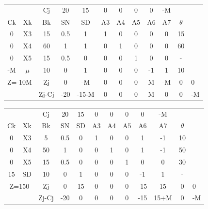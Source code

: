 \documentclass[a4paper,10pt]{article}
\begin{document}
\begin{center}
 \begin{tabular}{| c c c | c  c  c  c  c  c  c  c |}
    \hline
     	&			&   Cj   &   20    &   15    &   0    &   0    &   0    &   0    &   -M   &	       \\ 
    Ck 	&   Xk			&   Bk   &   SN    &   SD    &   A3   &   A4   &   A5   &   A6   &   A7   &  $\theta$    \\ \hline
    0   &   X3			&   15   &   0.5   &   1     &   1    &   0    &   0    &   0    &   0    &  15  		\\
    0 	&   X4			&   60   &   1     &   1     &   0    &   1    &   0    &   0    &   0    &  60	        \\ 
    0 	&   X5			&   15   &   0.5   &   0     &   0    &   0    &   1    &   0    &   0    &   - 		\\ 
   -M 	&   $\mu$		&   10   &   0     &   1     &   0    &   0    &   0    &  -1    &   1    &  10  		\\ \hline
\multicolumn{2}{|c|}{Z=-10M}	& Zj 	 &   0     &  -M     &   0    &   0    &   0    &   M    &  -M    &   0   &   0    	&    		\\ 
\multicolumn{2}{|c|}{}		& Zj-Cj  &  -20    &  -15-M  &   0    &   0    &   0    &   M    &   0    &   0    		&   -M   &    \\ 
    \hline
 \end{tabular}
\end{center}

\begin{center}
 \begin{tabular}{| c c c | c  c  c  c  c  c  c  c |}
    \hline
     	&			&   Cj   &   20    &   15    &   0    &   0    &   0    &   0    &   -M   &	       \\ 
    Ck 	&   Xk			&   Bk   &   SN    &   SD    &   A3   &   A4   &   A5   &   A6   &   A7   &  $\theta$    \\ \hline
    0   &   X3			&    5   &   0.5   &   0     &   1    &   0    &   0    &   1    &  -1    &  10  		\\
    0 	&   X4			&   50   &   1     &   0     &   0    &   1    &   0    &   1    &  -1    &  50	        \\ 
    0 	&   X5			&   15   &   0.5   &   0     &   0    &   0    &   1    &   0    &   0    &  30 		\\ 
    15 	&   SD			&   10   &   0     &   1     &   0    &   0    &   0    &  -1    &   1    &   -  		\\ \hline
\multicolumn{2}{|c|}{Z=150}	& Zj 	 &   0     &   15    &   0    &   0    &   0    &  -15   &   15   &   0   &   0    	&    		\\ 
 \multicolumn{2}{|c|}{}		& Zj-Cj  &  -20    &   0     &   0    &   0    &   0    &  -15   &   15+M &   0    		&   -M   &    \\ 
    \hline
 \end{tabular}
\end{center}
\end{document}
